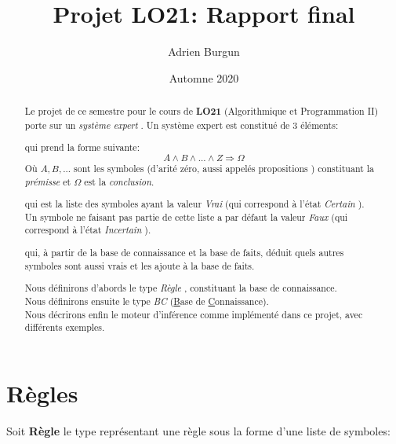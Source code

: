\documentclass[12pt]{article}
\title{Projet LO21: Rapport final}
\author{Adrien Burgun}
\date{Automne 2020}
\begin{document}
\maketitle

\begin{abstract}

  Le projet de ce semestre pour le cours de \textbf{LO21} (Algorithmique et Programmation II) porte sur un \textit{\og système expert \fg}.
  Un système expert est constitué de 3 éléments:

  \begin{description}[align=left]
    \item [Une base de connaissance,] qui prend la forme suivante:
    \[
      A \land B \land ... \land Z \Rightarrow \Omega
    \]
    Où \(A, B, ...\) sont les symboles (d'arité zéro, aussi appelés \og propositions \fg) constituant la \textit{prémisse} et \(\Omega\) est la \textit{conclusion}.

    \item [Une base de faits,] qui est la liste des symboles ayant la valeur \textit{\og Vrai \fg} (qui correspond à l'état \textit{\og Certain \fg}). \\
    Un symbole ne faisant pas partie de cette liste a par défaut la valeur \textit{\og Faux \fg} (qui correspond à l'état \textit{\og Incertain \fg}).

    \item [Un moteur d'inférence,] qui, à partir de la base de connaissance et la base de faits, déduit quels autres symboles sont aussi vrais et les ajoute à la base de faits.
  \end{description}

  Nous définirons d'abords le type \textit{\og Règle \fg}, constituant la base de connaissance. \\
  Nous définirons ensuite le type \textit{\og BC \fg} (\underline{B}ase de \underline{C}onnaissance). \\
  Nous décrirons enfin le moteur d'inférence comme implémenté dans ce projet, avec différents exemples.
\end{abstract}

\newpage

\section{Règles}

Soit \textbf{Règle} le type représentant une règle sous la forme d'une liste de symboles:
\end{document}
